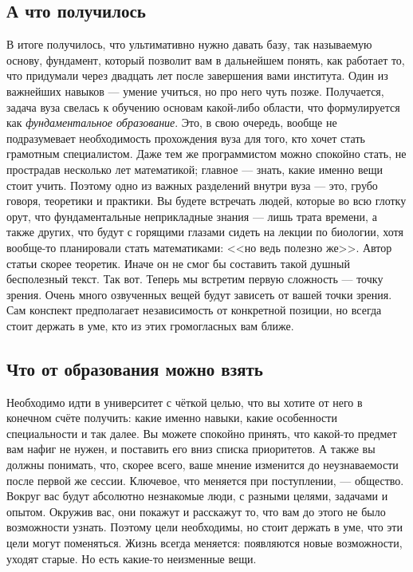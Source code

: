 \documentclass[12pt, a4paper]{article}
\begin{document}
\subsection{А что получилось}

В итоге получилось, что ультимативно нужно давать базу, так называемую основу, фундамент, который позволит вам в дальнейшем понять, как работает то, что придумали через двадцать лет после завершения вами института. Один из важнейших навыков --- умение учиться, но про него чуть позже. Получается, задача вуза свелась к обучению основам какой-либо области, что формулируется как \textit{фундаментальное образование}. Это, в свою очередь, вообще не подразумевает необходимость прохождения вуза для того, кто хочет стать грамотным специалистом. Даже тем же программистом можно спокойно стать, не прострадав несколько лет математикой; главное --- знать, какие именно вещи стоит учить. Поэтому одно из важных разделений внутри вуза --- это, грубо говоря, теоретики и практики. Вы будете встречать людей, которые во всю глотку орут, что фундаментальные неприкладные знания --- лишь трата времени, а также других, что будут с горящими глазами сидеть на лекции по биологии, хотя вообще-то планировали стать математиками: <<но ведь полезно же>>. Автор статьи скорее теоретик. Иначе он не смог бы составить такой душный бесполезный текст. Так вот. Теперь мы встретим первую сложность --- точку зрения. Очень много озвученных вещей будут зависеть от вашей точки зрения. Сам конспект предполагает независимость от конкретной позиции, но всегда стоит держать в уме, кто из этих громогласных вам ближе.

\subsection{Что от образования можно взять}

Необходимо идти в университет с чёткой целью, что вы хотите от него в конечном счёте получить: какие именно навыки, какие особенности специальности и так далее. Вы можете спокойно принять, что какой-то предмет вам нафиг не нужен, и поставить его вниз списка приоритетов. А также вы должны понимать, что, скорее всего, ваше мнение изменится до неузнаваемости после первой же сессии. Ключевое, что меняется при поступлении, --- общество. Вокруг вас будут абсолютно незнакомые люди, с разными целями, задачами и опытом. Окружив вас, они покажут и расскажут то, что вам до этого не было возможности узнать. Поэтому цели необходимы, но стоит держать в уме, что эти цели могут поменяться. Жизнь всегда меняется: появляются новые возможности, уходят старые. Но есть какие-то неизменные вещи.
\end{document}
